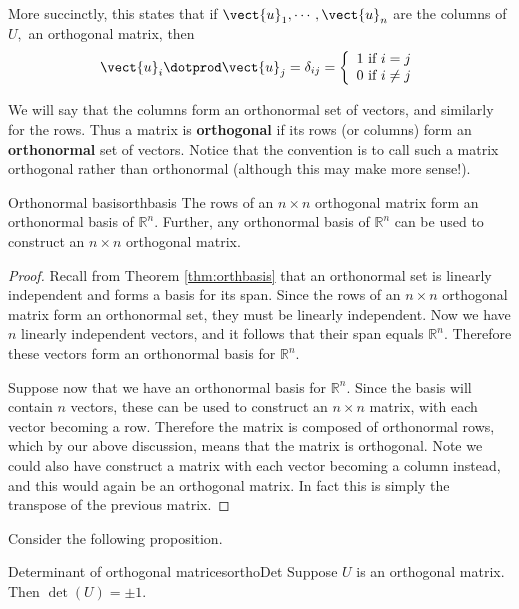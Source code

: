 More succinctly, this states that if $\vect{u}_{1},\cdots ,\vect{u}_{n}$
are the columns of $U,$ an orthogonal matrix, then 
\[
\vect{u}_{i}\dotprod \vect{u}_{j}=\delta _{ij} = \left\{ 
\begin{array}{c}
1\text{ if }i=j \\ 
0\text{ if }i\neq j
\end{array}
\right.  
\]

We will say that the columns form an orthonormal set of vectors, and similarly for the rows. Thus a matrix is \textbf{orthogonal} if its rows (or columns) form an
\textbf{orthonormal} set of vectors. Notice that the convention is to call such a matrix orthogonal rather than orthonormal (although this may make more sense!). 

\begin{proposition}{Orthonormal basis}{orthbasis}
The rows of an $n \times n$ orthogonal matrix form an orthonormal
basis of $\mathbb{R}^n$. Further, any orthonormal basis of
$\mathbb{R}^n$ can be used to construct an $n \times n$ orthogonal
matrix.
\end{proposition}

\begin{proof}
Recall from Theorem \ref{thm:orthbasis} that an orthonormal set is
linearly independent and forms a basis for its span. Since the rows of
an $n \times n$ orthogonal matrix form an orthonormal set, they must
be linearly independent. Now we have $n$ linearly independent vectors,
and it follows that their span equals $\mathbb{R}^n$. Therefore these
vectors form an orthonormal basis for $\mathbb{R}^n$.

Suppose now that we have an orthonormal basis for $\mathbb{R}^n$. Since the
basis will contain $n$ vectors, these can be used to construct an $n
\times n$ matrix, with each vector becoming a row. Therefore the
matrix is composed of orthonormal rows, which by our above discussion,
means that the matrix is orthogonal. Note we could also have construct
a matrix with each vector becoming a column instead, and this would
again be an orthogonal matrix. In fact this is simply the transpose of
the previous matrix.
\end{proof}

Consider the following proposition.

\begin{proposition}{Determinant of orthogonal matrices}{orthoDet}
Suppose $U$ is an orthogonal matrix. Then $\det \left( U\right) = \pm 1.$ 
\end{proposition}

